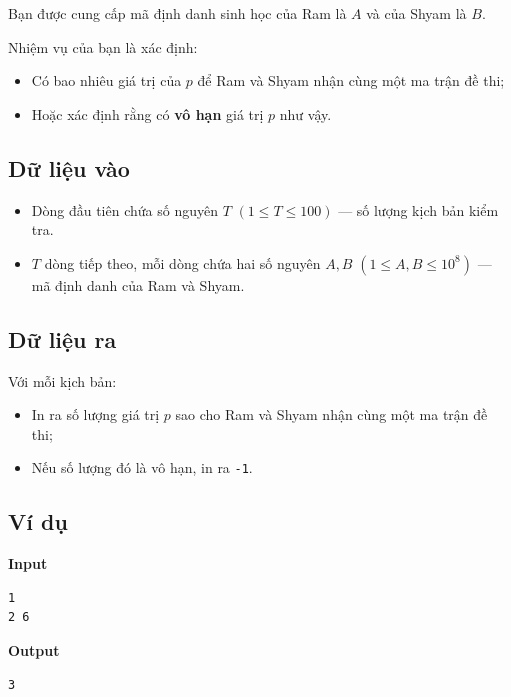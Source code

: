 Bạn được cung cấp mã định danh sinh học của Ram là $A$ và của Shyam là $B$.

Nhiệm vụ của bạn là xác định:
\begin{itemize}
    \item Có bao nhiêu giá trị của $p$ để Ram và Shyam nhận cùng một ma trận đề thi;
    \item Hoặc xác định rằng có \textbf{vô hạn} giá trị $p$ như vậy.
\end{itemize}

\subsection*{Dữ liệu vào}

\begin{itemize}
    \item Dòng đầu tiên chứa số nguyên $T$ $(1 \le T \le 100)$ — số lượng kịch bản kiểm tra.
    \item $T$ dòng tiếp theo, mỗi dòng chứa hai số nguyên $A, B$ $(1 \le A, B \le 10^8)$ — mã định danh của Ram và Shyam.
\end{itemize}

\subsection*{Dữ liệu ra}

Với mỗi kịch bản:
\begin{itemize}
    \item In ra số lượng giá trị $p$ sao cho Ram và Shyam nhận cùng một ma trận đề thi;
    \item Nếu số lượng đó là vô hạn, in ra \texttt{-1}.
\end{itemize}

\subsection*{Ví dụ}

\noindent
\begin{minipage}[t]{0.48\textwidth}
\textbf{Input}
\begin{verbatim}
1
2 6
\end{verbatim}
\end{minipage}
\hfill
\begin{minipage}[t]{0.48\textwidth}
\textbf{Output}
\begin{verbatim}
3
\end{verbatim}
\end{minipage}

